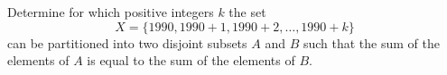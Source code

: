 Determine for which positive integers $k$ the set
\[ X = \{1990, 1990+1, 1990+2, \ldots, 1990+k\} \]
can be partitioned into two disjoint subsets $A$ and $B$ such that the sum of the elements of $A$ is equal to the sum of the elements of $B$.
